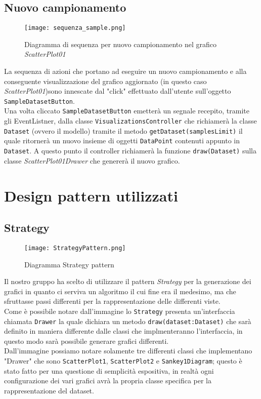 \subsection{Nuovo campionamento}
\begin{figure}[H]
    \texttt{[image: sequenza\_sample.png]}
    \caption{Diagramma di sequenza per nuovo campionamento nel grafico \textit{ScatterPlot01}}
\end{figure}
La sequenza di azioni che portano ad eseguire un nuovo campionamento e alla conseguente visualizzazione del grafico aggiornato (in questo caso \textit{ScatterPlot01})sono innescate dal "click" effettuato dall'utente sull'oggetto \texttt{SampleDatasetButton}.\\
Una volta cliccato \texttt{SampleDatasetButton} emetterà un segnale recepito, tramite gli EventListner, dalla classe \texttt{VisualizationsController} che richiamerà la classe \texttt{Dataset} (ovvero il modello) tramite il metodo \texttt{getDataset(samplesLimit)} il quale ritornerà un nuovo insieme di oggetti \texttt{DataPoint} contenuti appunto in \texttt{Dataset}. A questo punto il controller richiamerà la funzione \texttt{draw(Dataset)} sulla classe \textit{ScatterPlot01Drawer} che genererà il nuovo grafico.


\section{Design pattern utilizzati}
\subsection{Strategy}
\begin{figure}[H]
	\centering
	\texttt{[image: StrategyPattern.png]}
	\caption{Diagramma Strategy pattern}
  \end{figure}
Il nostro gruppo ha scelto di utilizzare il pattern \textit{Strategy} per la generazione dei grafici in quanto ci serviva un algoritmo il cui fine era il medesimo, ma che sfruttasse passi differenti per la rappresentazione delle differenti viste.\\
Come è possibile notare dall'immagine lo \texttt{Strategy} presenta un'interfaccia chiamata \texttt{Drawer} la quale dichiara un metodo \texttt{draw(dataset:Dataset)} che sarà definito in maniera differente dalle classi che implmenteranno l'interfaccia, in questo modo sarà possibile generare grafici differenti.\\
Dall'immagine possiamo notare solamente tre differenti classi che implementano "Drawer" che sono \texttt{ScatterPlot1}, \texttt{ScatterPlot2} e \texttt{Sankey1Diagram}; questo è stato fatto per una questione di semplicità espositiva, in realtà ogni configurazione dei vari grafici avrà la propria classe specifica per la rappresentazione del dataset. \\

